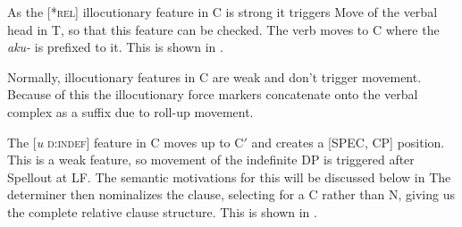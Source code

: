 \documentclass[output=paper]{LSP/langsci}
\begin{document}
\ea \label{boyle36}
{\hspace{1em}}\newline

\z

As the [*\textsc{rel}] illocutionary feature in C is strong it triggers Move of the verbal head in T, so that this feature can be checked. The verb moves to C where the \textit{aku-} is prefixed to it. This is shown in .

\ea	\label{boyle37}
{\hspace{1em}}\newline

\z

Normally, illocutionary features in C are weak and don't trigger movement. Because of this the illocutionary force markers concatenate onto the verbal complex as a suffix due to roll-up movement.  

The [\textit{u} \textsc{d:indef}] feature in C moves up to C$'$ and creates a [SPEC, CP] position. This is a weak feature, so movement of the indefinite DP is triggered after Spellout at LF. The semantic motivations for this will be discussed below in  The determiner then nominalizes the clause, selecting for a C rather than N, giving us the complete relative clause structure. This is shown in .  
\end{document}
